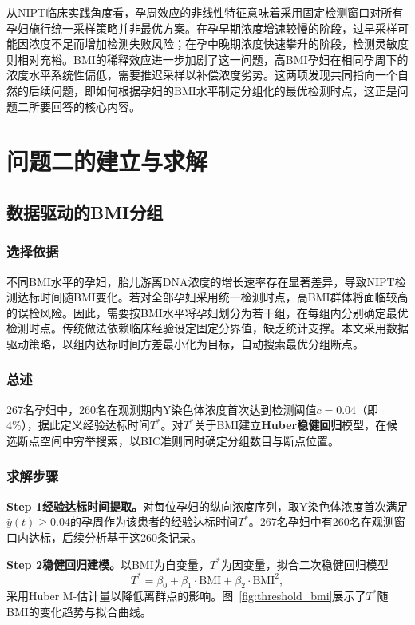 \documentclass[withoutpreface]{cumcmthesis}
\begin{document}
从NIPT临床实践角度看，孕周效应的非线性特征意味着采用固定检测窗口对所有孕妇施行统一采样策略并非最优方案。在孕早期浓度增速较慢的阶段，过早采样可能因浓度不足而增加检测失败风险；在孕中晚期浓度快速攀升的阶段，检测灵敏度则相对充裕。BMI的稀释效应进一步加剧了这一问题，高BMI孕妇在相同孕周下的浓度水平系统性偏低，需要推迟采样以补偿浓度劣势。这两项发现共同指向一个自然的后续问题，即如何根据孕妇的BMI水平制定分组化的最优检测时点，这正是问题二所要回答的核心内容。

\section{问题二的建立与求解}

\subsection{数据驱动的BMI分组}

\subsubsection{选择依据}

不同BMI水平的孕妇，胎儿游离DNA浓度的增长速率存在显著差异，导致NIPT检测达标时间随BMI变化。若对全部孕妇采用统一检测时点，高BMI群体将面临较高的误检风险。因此，需要按BMI水平将孕妇划分为若干组，在每组内分别确定最优检测时点。传统做法依赖临床经验设定固定分界值，缺乏统计支撑。本文采用数据驱动策略，以组内达标时间方差最小化为目标，自动搜索最优分组断点。

\subsubsection{总述}

267名孕妇中，260名在观测期内Y染色体浓度首次达到检测阈值$c=0.04$（即4\%），据此定义经验达标时间$T^*$。对$T^*$关于BMI建立\textbf{Huber稳健回归}模型，在候选断点空间中穷举搜索，以BIC准则同时确定分组数目与断点位置。

\subsubsection{求解步骤}

\textbf{Step 1\quad 经验达标时间提取。}对每位孕妇的纵向浓度序列，取Y染色体浓度首次满足$\hat{y}(t) \geq 0.04$的孕周作为该患者的经验达标时间$T^*$。267名孕妇中有260名在观测窗口内达标，后续分析基于这260条记录。

\textbf{Step 2\quad 稳健回归建模。}以BMI为自变量，$T^*$为因变量，拟合二次稳健回归模型
\begin{equation}\label{eq:robust_reg}
  T^* = \beta_0 + \beta_1 \cdot \mathrm{BMI} + \beta_2 \cdot \mathrm{BMI}^2,
\end{equation}
采用Huber M-估计量以降低离群点的影响。图~\ref{fig:threshold_bmi}展示了$T^*$随BMI的变化趋势与拟合曲线。
\end{document}
